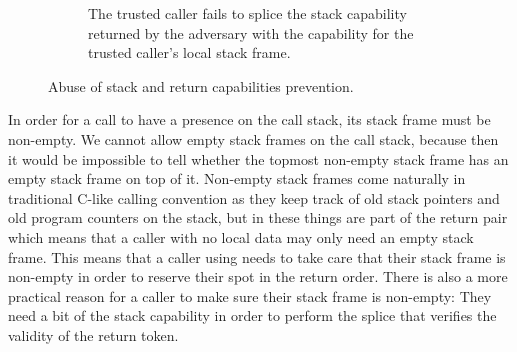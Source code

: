 \documentclass[acmsmall,screen]{acmart}\settopmatter{}
\begin{document}
\begin{figure}
\begin{subfigure}{0.4\linewidth}
    \caption{The trusted caller fails to splice the stack capability returned by
    the adversary with the capability for the trusted caller's local stack frame.}
    \label{fig:ret-ptr-abuse-prev}
  \end{subfigure}
  \caption{Abuse of stack and return capabilities prevention.}
\end{figure}

In order for a call to have a presence on the call stack, its stack frame must be non-empty.
We cannot allow empty stack frames on the call stack, because then it would be impossible to tell whether the topmost non-empty stack frame has an empty stack frame on top of it.
Non-empty stack frames come naturally in traditional C-like calling convention as they keep track of old stack pointers and old program counters on the stack, but in \stktokens{} these things are part of the return pair which means that a caller with no local data may only need an empty stack frame.
This means that a caller using \stktokens{} needs to take care that their stack frame is non-empty in order to reserve their spot in the return order.
There is also a more practical reason for a \stktokens{} caller to make sure their stack frame is non-empty: They need a bit of the stack capability in order to perform the splice that verifies the validity of the return token.
\end{document}
